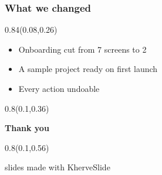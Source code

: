 \documentclass[aspectratio=169]{beamer}
\begin{document}
\begin{frame}[t]
  \frametitle{What we changed}

\begin{textblock}{0.84}(0.08,0.26)
{\raggedright\fontsize{22}{26}\selectfont \textcolor[HTML]{E6EAF2}{\begin{itemize}
\item Onboarding cut from 7 screens to 2
\item A sample project ready on first launch
\item Every action undoable
\end{itemize}}\par}
\end{textblock}
\end{frame}

\begin{frame}[t]

\begin{textblock}{0.8}(0.1,0.36)
{\centering\fontsize{40}{48}\selectfont \textcolor[HTML]{F2C14E}{\textbf{Thank you}}\par}
\end{textblock}

\begin{textblock}{0.8}(0.1,0.56)
{\centering\fontsize{15}{18}\selectfont \textcolor[HTML]{AAB4C8}{slides made with KherveSlide}\par}
\end{textblock}
\end{frame}
\end{document}
